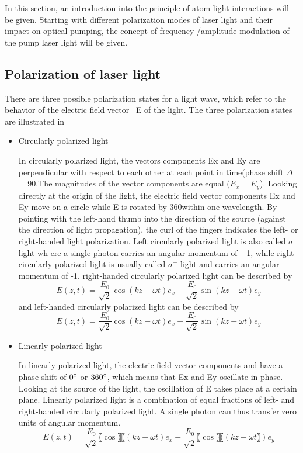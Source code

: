In this section, an introduction into the principle of atom-light interactions will be given. Starting with different polarization modes of laser light and their impact on optical pumping, the concept of frequency /amplitude modulation of the pump laser light will be given.

\subsection{Polarization of laser light} 
There are three possible polarization states for a light wave, which refer to the behavior of the electric field vector ~E of the light. The three polarization states are illustrated in

\begin{itemize}
\item Circularly polarized light

In circularly polarized light, the vectors components Ex and Ey are perpendicular with respect to each other at each point in time(phase shift $\Delta$ = 90\degree.The magnitudes of the vector components are equal ($E_x = E_y$). Looking directly at the origin of the light, the electric field vector components Ex and Ey move on a circle while E is rotated by 360\degree within one wavelength. By pointing with the left-hand thumb into the direction of the source (against the direction of light propagation), the curl of the fingers indicates the left- or right-handed light polarization. Left circularly polarized light is also called $ \sigma^+$ light wh
ere a single photon carries an angular momentum of +1, while right circularly polarized light is usually called $\sigma^-$ light and carries an angular momentum of -1.
\medskip
right-handed circularly polarized light can be described by
\begin{equation}
     E(z,t)=\frac{E_0}{\sqrt{2}} \cos⁡(kz-\omega t)e_x+\frac{E_0}{\sqrt{2}}  \sin ⁡(kz-\omega t)e_y
\end{equation}
and left-handed circularly polarized light can be described by
\begin{equation}
     E(z,t)=\frac{E_0}{\sqrt{2}} \cos⁡(kz-\omega t)e_x-\frac{E_0}{\sqrt{2}} \sin⁡ (kz-\omega t)e_y
\end{equation}
\end{itemize}
\begin{itemize}
\item Linearly polarized light

In linearly polarized light, the electric field vector components  and  have a phase shift of $0 \degree$ or $360\degree$, which means that Ex and Ey oscillate in phase. Looking at the source of the light, the oscillation of E takes place at a certain plane. Linearly polarized light is a combination of equal fractions of left- and right-handed circularly polarized light. A single photon can thus transfer zero units of angular momentum. 
\begin{equation}
     E(z,t)=\frac{E_0}{\sqrt{2}}〖\cos〗⁡〖(kz-\omega t)e_x-\frac{E_0}{\sqrt{2}}〖\cos〗⁡〖(kz-\omega t〗)e_y
\end{equation}
\end{itemize}
